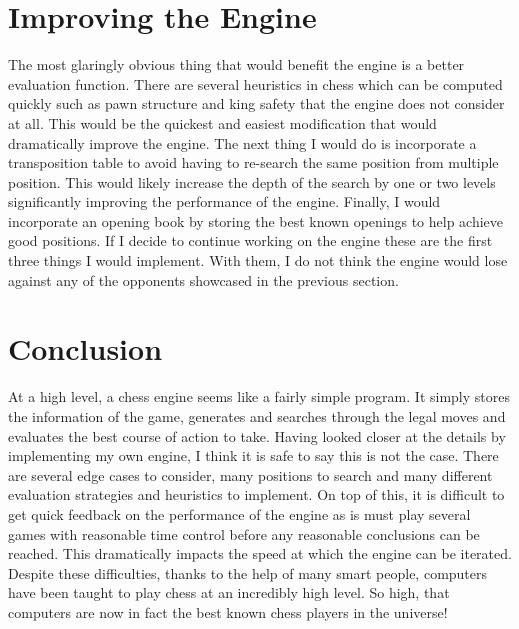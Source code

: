 \documentclass[11pt]{article}
\begin{document}
\section{Improving the Engine}
The most glaringly obvious thing that would benefit the engine is a better evaluation function. There are several heuristics in chess which can be computed quickly such as pawn structure and king safety that the engine does not consider at all. This would be the quickest and easiest modification that would dramatically improve the engine. The next thing I would do is incorporate a transposition table to avoid having to re-search the same position from multiple position. This would likely increase the depth of the search by one or two levels significantly improving the performance of the engine. Finally, I would incorporate an opening book by storing the best known openings to help achieve good positions. If I decide to continue working on the engine these are the first three things I would implement. With them, I do not think the engine would lose against any of the opponents showcased in the previous section. 

\section{Conclusion}
At a high level, a chess engine seems like a fairly simple program. It simply stores the information of the game, generates and searches through the legal moves and evaluates the best course of action to take. Having looked closer at the details by implementing my own engine, I think it is safe to say this is not the case. There are several edge cases to consider, many positions to search and many different evaluation strategies and heuristics to implement. On top of this, it is difficult to get quick feedback on the performance of the engine as is must play several games with reasonable time control before any reasonable conclusions can be reached. This dramatically impacts the speed at which the engine can be iterated. Despite these difficulties, thanks to the help of many smart people, computers have been taught to play chess at an incredibly high level. So high, that computers are now in fact the best known chess players in the universe!

\vspace{\fill}



\end{document}
